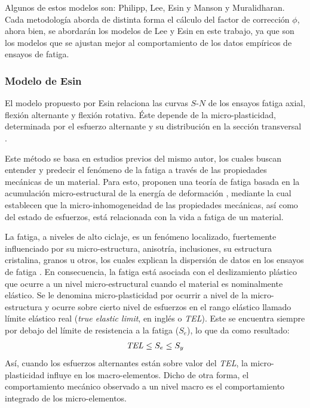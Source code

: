 Algunos de estos modelos son: Philipp, Lee, Esin y Manson y Muralidharan. Cada metodología aborda de distinta forma el cálculo del factor de corrección $\phi$, ahora bien, se abordarán los modelos de Lee y Esin en este trabajo, ya que son los modelos que se ajustan mejor al comportamiento de los datos empíricos de ensayos de fatiga.\cite{strzelecki2018analysis}

\subsubsection{Modelo de Esin}
El modelo propuesto por Esin \cite{esin1980method} relaciona las curvas $S$-$N$ de los ensayos fatiga axial, flexión alternante y flexión rotativa. Éste depende de la micro-plasticidad, determinada por el esfuerzo alternante y su distribución en la sección transversal \cite{strzelecki2018analysis}. 

Este método se basa en estudios previos del mismo autor, los cuales buscan entender y predecir el fenómeno de la fatiga a través de las propiedades mecánicas de un material. Para esto, proponen una teoría de fatiga basada en la acumulación micro-estructural de la energía de deformación \cite{esin1966theory}, mediante la cual establecen que la micro-inhomogeneidad de las propiedades mecánicas, así como del estado de esfuerzos, está relacionada con la vida a fatiga de un material.

La fatiga, a niveles de alto ciclaje, es un fenómeno localizado, fuertemente influenciado por su micro-estructura, anisotría, inclusiones, su estructura cristalina, granos u otros, los cuales explican la dispersión de datos en los ensayos de fatiga \cite{esin1968microplastic}. En consecuencia, la fatiga está asociada con el deslizamiento plástico que ocurre a un nivel micro-estructural cuando el material es nominalmente elástico. Se le denomina micro-plasticidad por ocurrir a nivel de la micro-estructura y ocurre sobre cierto nivel de esfuerzos en el rango elástico llamado límite elástico real (\textit{true elastic limit}, en inglés o \textit{TEL}). Este se encuentra siempre por debajo del límite de resistencia a la fatiga ($S_e$), lo que da como resultado:
\begin{align*}
	\text{\textit{TEL}} \leq S_e \leq S_y
\end{align*}
Así, cuando los esfuerzos alternantes están sobre valor del  \textit{TEL}, la micro-plasticidad influye en los macro-elementos. Dicho de otra forma, el comportamiento mecánico observado a un nivel macro es el comportamiento integrado de los micro-elementos.

